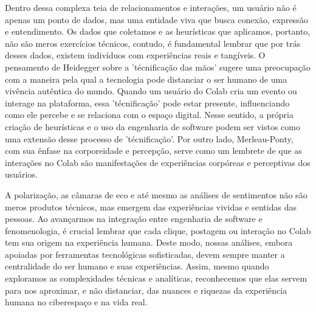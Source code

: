 Dentro dessa complexa teia de relacionamentos e interações, um usuário não é apenas um ponto de dados, mas uma entidade viva que busca conexão, expressão e entendimento. Os dados que coletamos e as heurísticas que aplicamos, portanto, não são meros exercícios técnicos, contudo, é fundamental lembrar que por trás desses dados, existem indivíduos com experiências reais e tangíveis. O pensamento de Heidegger sobre a 'técnificação das mãos' sugere uma preocupação com a maneira pela qual a tecnologia pode distanciar o ser humano de uma vivência autêntica do mundo. Quando um usuário do Colab cria um evento ou interage na plataforma, essa 'técnificação' pode estar presente, influenciando como ele percebe e se relaciona com o espaço digital. Nesse sentido, a própria criação de heurísticas e o uso da engenharia de software podem ser vistos como uma extensão desse processo de 'técnificação'. Por outro lado, Merleau-Ponty, com sua ênfase na corporeidade e percepção, serve como um lembrete de que as interações no Colab são manifestações de experiências corpóreas e perceptivas dos usuários.

A polarização, as câmaras de eco e até mesmo as análises de sentimentos não são meros produtos técnicos, mas emergem das experiências vividas e sentidas das pessoas. Ao avançarmos na integração entre engenharia de software e fenomenologia, é crucial lembrar que cada clique, postagem ou interação no Colab tem sua origem na experiência humana. Deste modo, nossas análises, embora apoiadas por ferramentas tecnológicas sofisticadas, devem sempre manter a centralidade do ser humano e suas experiências. Assim, mesmo quando exploramos as complexidades técnicas e analíticas, reconhecemos que elas servem para nos aproximar, e não distanciar, das nuances e riquezas da experiência humana no ciberespaço e na vida real.